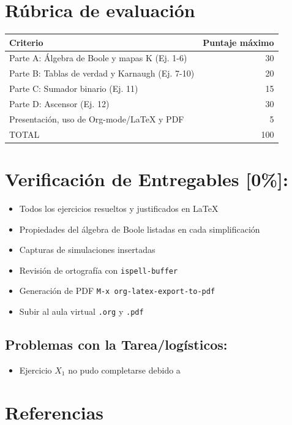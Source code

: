\documentclass[11pt]{article}
\begin{document}
\section{Rúbrica de evaluación}
\label{sec:org243e20b}
\begin{center}
\begin{tabular}{lr}
Criterio & Puntaje máximo\\[0pt]
\hline
Parte A: Álgebra de Boole y mapas K (Ej. 1-6) & 30\\[0pt]
Parte B: Tablas de verdad y Karnaugh (Ej. 7-10) & 20\\[0pt]
Parte C: Sumador binario (Ej. 11) & 15\\[0pt]
Parte D: Ascensor (Ej. 12) & 30\\[0pt]
Presentación, uso de Org-mode/\LaTeX{} y PDF & 5\\[0pt]
TOTAL & 100\\[0pt]
\end{tabular}
\end{center}

\section{Verificación de Entregables [0\%]:}
\label{sec:org28200a3}
\begin{itemize}
\item[{$\square$}] Todos los ejercicios resueltos y justificados en \LaTeX{}
\item[{$\square$}] Propiedades del álgebra de Boole listadas en cada simplificación
\item[{$\square$}] Capturas de simulaciones insertadas
\item[{$\square$}] Revisión de ortografía con \texttt{ispell-buffer}
\item[{$\square$}] Generación de PDF \texttt{M-x org-latex-export-to-pdf}
\item[{$\square$}] Subir al aula virtual \texttt{.org} y \texttt{.pdf}
\end{itemize}

\subsection{Problemas con la Tarea/logísticos:}
\label{sec:org28b7bb9}
\begin{itemize}
\item Ejercicio \(X_1\) no pudo completarse debido a
\end{itemize}

\section{Referencias}
\label{sec:orgb3773f1}
\printbibliography
\end{document}
